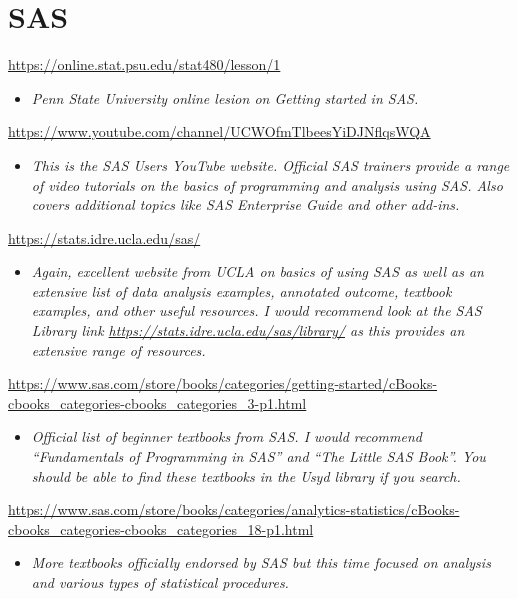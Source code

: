 \documentclass[
]{book}
\providecommand{\tightlist}{%
  \setlength{\itemsep}{0pt}\setlength{\parskip}{0pt}}
\begin{document}
\hypertarget{sas}{%
\section{SAS}\label{sas}}

\url{https://online.stat.psu.edu/stat480/lesson/1}

\begin{itemize}
\tightlist
\item
  \emph{Penn State University online lesion on Getting started in SAS.}
\end{itemize}

\url{https://www.youtube.com/channel/UCWOfmTlbeesYiDJNflqsWQA}

\begin{itemize}
\tightlist
\item
  \emph{This is the SAS Users YouTube website. Official SAS trainers provide a range of video tutorials on the basics of programming and analysis using SAS. Also covers additional topics like SAS Enterprise Guide and other add-ins.}
\end{itemize}

\url{https://stats.idre.ucla.edu/sas/}

\begin{itemize}
\tightlist
\item
  \emph{Again, excellent website from UCLA on basics of using SAS as well as an extensive list of data analysis examples, annotated outcome, textbook examples, and other useful resources. I would recommend look at the SAS Library link \url{https://stats.idre.ucla.edu/sas/library/} as this provides an extensive range of resources.}
\end{itemize}

\url{https://www.sas.com/store/books/categories/getting-started/cBooks-cbooks_categories-cbooks_categories_3-p1.html}

\begin{itemize}
\tightlist
\item
  \emph{Official list of beginner textbooks from SAS. I would recommend ``Fundamentals of Programming in SAS'' and ``The Little SAS Book''. You should be able to find these textbooks in the Usyd library if you search.}
\end{itemize}

\url{https://www.sas.com/store/books/categories/analytics-statistics/cBooks-cbooks_categories-cbooks_categories_18-p1.html}

\begin{itemize}
\tightlist
\item
  \emph{More textbooks officially endorsed by SAS but this time focused on analysis and various types of statistical procedures.}
\end{itemize}
\end{document}
